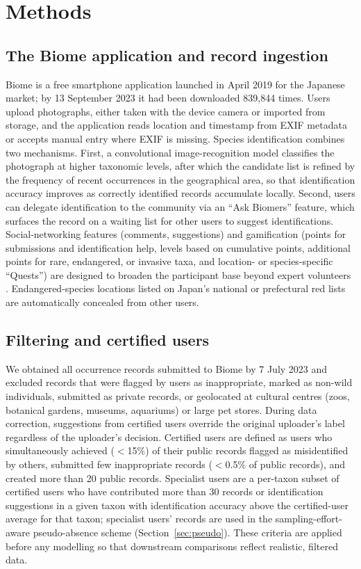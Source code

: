 \documentclass[11pt]{article}
\begin{document}
\section{Methods}

\subsection{The Biome application and record ingestion}

Biome is a free smartphone application launched in April 2019 for the Japanese market; by 13 September 2023 it had been downloaded 839{,}844 times. Users upload photographs, either taken with the device camera or imported from storage, and the application reads location and timestamp from EXIF metadata or accepts manual entry where EXIF is missing. Species identification combines two mechanisms. First, a convolutional image-recognition model classifies the photograph at higher taxonomic levels, after which the candidate list is refined by the frequency of recent occurrences in the geographical area, so that identification accuracy improves as correctly identified records accumulate locally. Second, users can delegate identification to the community via an ``Ask Biomers'' feature, which surfaces the record on a waiting list for other users to suggest identifications. Social-networking features (comments, suggestions) and gamification (points for submissions and identification help, levels based on cumulative points, additional points for rare, endangered, or invasive taxa, and location- or species-specific ``Quests'') are designed to broaden the participant base beyond expert volunteers \citep{bonney2009citizen,chandler2017contribution}. Endangered-species locations listed on Japan's national or prefectural red lists are automatically concealed from other users.

\subsection{Filtering and certified users}

We obtained all occurrence records submitted to Biome by 7 July 2023 and excluded records that were flagged by users as inappropriate, marked as non-wild individuals, submitted as private records, or geolocated at cultural centres (zoos, botanical gardens, museums, aquariums) or large pet stores. During data correction, suggestions from certified users override the original uploader's label regardless of the uploader's decision. Certified users are defined as users who simultaneously achieved ($<$15\%) of their public records flagged as misidentified by others, submitted few inappropriate records ($<$0.5\% of public records), and created more than 20 public records. Specialist users are a per-taxon subset of certified users who have contributed more than 30 records or identification suggestions in a given taxon with identification accuracy above the certified-user average for that taxon; specialist users' records are used in the sampling-effort-aware pseudo-absence scheme (Section~\ref{sec:pseudo}). These criteria are applied before any modelling so that downstream comparisons reflect realistic, filtered data.
\end{document}
